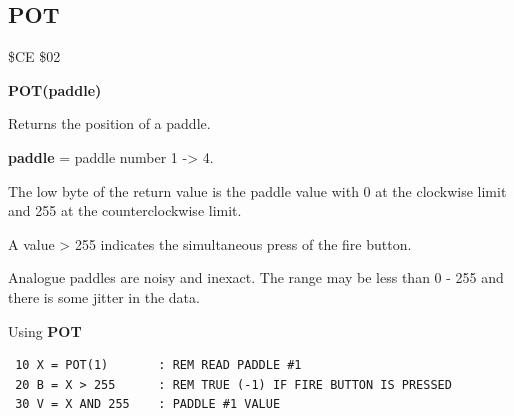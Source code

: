 \subsection{POT}
\begin{description}[leftmargin=2cm,style=nextline]
\item [Token:] \$CE \$02
\item [Format:] {\bf POT(paddle)}
\item [Usage:]  Returns the position of a paddle.

                {\bf paddle} = paddle number 1 -> 4.

                The low byte of the return value is the
                paddle value
                with 0 at the clockwise limit and 255 at the
                counterclockwise limit.

                A value > 255 indicates the simultaneous press
                of the fire button.

\item [Remarks:] Analogue paddles are noisy and inexact.
                 The range may be less than 0 - 255 and there
                 is some jitter in the data.


\item [Example:] Using {\bf POT}

\begin{tcolorbox}[colback=black,coltext=white]
\verbatimfont{\codefont}
\begin{verbatim}
 10 X = POT(1)       : REM READ PADDLE #1
 20 B = X > 255      : REM TRUE (-1) IF FIRE BUTTON IS PRESSED
 30 V = X AND 255    : PADDLE #1 VALUE
\end{verbatim}
\end{tcolorbox}
\end{description}


\newpage
